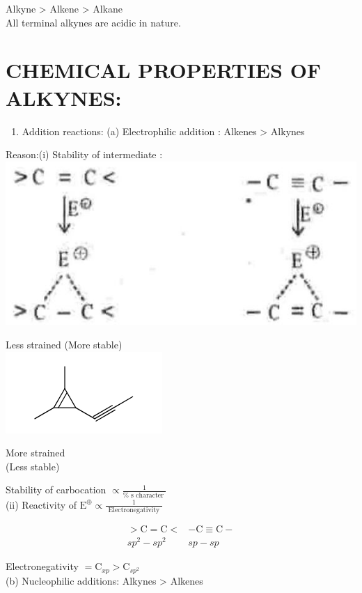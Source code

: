 \documentclass[10pt]{article}
\begin{document}
Alkyne > Alkene > Alkane\\
All terminal alkynes are acidic in nature.

\section*{CHEMICAL PROPERTIES OF ALKYNES:}
\begin{enumerate}
  \item Addition reactions: (a) Electrophilic addition : Alkenes > Alkynes
\end{enumerate}

Reason:(i) Stability of intermediate :\\
\includegraphics[max width=\textwidth, center]{2025_01_28_8470952b98110cec3aabg-188}

Less strained (More stable)\\
\includegraphics{smile-b5af4d192409b2550fb7e46f0111f22c9019928f}

More strained\\
(Less stable)

Stability of carbocation $\propto \frac{1}{\% \text { s character }}$\\
(ii) Reactivity of $\mathrm{E}^{\oplus} \propto \frac{1}{\text { Electronegativity }}$

$$
\begin{array}{lc}
>\mathrm{C}=\mathrm{C}< & -\mathrm{C} \equiv \mathrm{C}- \\
s p^{2}-s p^{2} & s p-s p
\end{array}
$$

Electronegativity $=\mathrm{C}_{x p}>\mathrm{C}_{s p^{2}}$\\
(b) Nucleophilic additions: Alkynes > Alkenes
\end{document}
